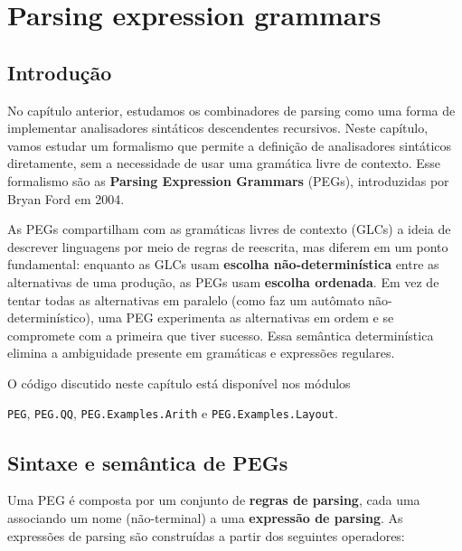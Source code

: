 \chapter{Parsing expression grammars}

\section{Introdução}

No capítulo anterior, estudamos os combinadores de parsing como uma
forma de implementar analisadores sintáticos descendentes recursivos.
Neste capítulo, vamos estudar um formalismo que permite a definição
de analisadores sintáticos diretamente, sem a necessidade de usar uma
gramática livre de contexto. Esse formalismo são as \textbf{Parsing
Expression Grammars} (PEGs), introduzidas por Bryan Ford em 2004.

As PEGs compartilham com as gramáticas livres de contexto (GLCs) a
ideia de descrever linguagens por meio de regras de reescrita, mas
diferem em um ponto fundamental: enquanto as GLCs usam
\textbf{escolha não-determinística} entre as alternativas de uma
produção, as PEGs usam \textbf{escolha ordenada}. Em vez de tentar
todas as alternativas em paralelo (como faz um autômato
não-determinístico), uma PEG experimenta as alternativas em ordem e
se compromete com a primeira que tiver sucesso. Essa semântica
determinística elimina a ambiguidade presente em gramáticas e
expressões regulares.

O código discutido neste capítulo está disponível nos módulos
\begin{flushleft}
  \verb|PEG|, \verb|PEG.QQ|, \verb|PEG.Examples.Arith| e
  \verb|PEG.Examples.Layout|.
\end{flushleft}

\section{Sintaxe e semântica de PEGs}

Uma PEG é composta por um conjunto de \textbf{regras de parsing},
cada uma associando um nome (não-terminal) a uma \textbf{expressão de
parsing}. As expressões de parsing são construídas a partir dos
seguintes operadores:

